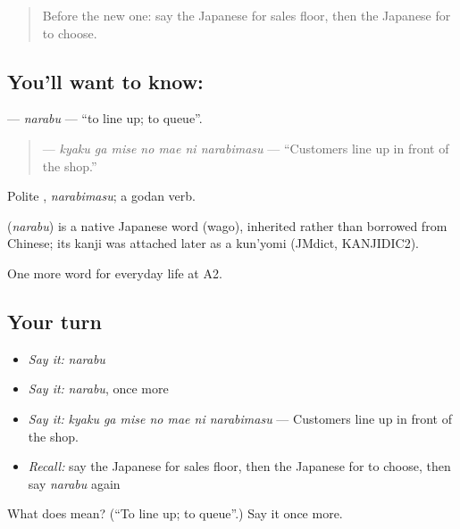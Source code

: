 \label{lesson:JA-C183-narabu}



\begin{quote}
Before the new one: say the Japanese for sales floor, then the Japanese for to choose.
\end{quote}

\subsection*{You'll want to know: }
\textbf{} — \emph{narabu} — \textquotedblleft{}to line up; to queue\textquotedblright{}.

\begin{quote}
\textbf{   } — \emph{kyaku ga mise no mae ni narabimasu} — \textquotedblleft{}Customers line up in front of the shop.\textquotedblright{}
\end{quote}

Polite \textbf{}, \emph{narabimasu}; a godan verb.

\begin{cousinweb}
\textbf{} (\emph{narabu}) is a native Japanese word (wago), inherited rather than borrowed from Chinese; its kanji was attached later as a kun'yomi (JMdict, KANJIDIC2).
\end{cousinweb}

\begin{grammarlens}[title={What you've built}]
One more word for everyday life at A2.
\end{grammarlens}

\subsection*{Your turn}
\begin{itemize}
\raggedright
  \item \emph{Say it:} \emph{narabu}
  \item \emph{Say it:} \emph{narabu}, once more
  \item \emph{Say it:} \emph{kyaku ga mise no mae ni narabimasu} — Customers line up in front of the shop.
  \item \emph{Recall:} say the Japanese for sales floor, then the Japanese for to choose, then say \emph{narabu} again
\end{itemize}

\begin{tcolorbox}[breakable,colback=teal!4,colframe=teal!35!black,title={Before you move on}]
What does  mean? (\textquotedblleft{}To line up; to queue\textquotedblright{}.) Say it once more.
\end{tcolorbox}
